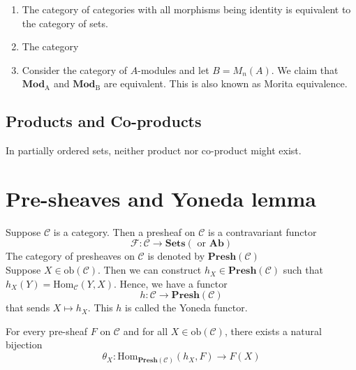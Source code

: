 \documentclass[oneside, 12pt]{scrbook}
\theoremstyle{theorem}
\begin{document}
\begin{example}
\begin{enumerate}
\item The category of categories with all morphisms being identity is equivalent to the category of sets.
\item The category 
\item Consider the category of $A$-modules and let $B = M_{n}(A)$. We claim that $\mathrm{\textbf{Mod}_{A}}$ and $\mathrm{\textbf{Mod}_{B}}$ are equivalent. This is also known as Morita equivalence.
\end{enumerate}
\end{example}

\subsection{Products and Co-products}


In partially ordered sets, neither product nor co-product might exist. \\

\section{Pre-sheaves and Yoneda lemma}

Suppose $\mathcal{C}$ is a category. Then a presheaf on $\mathcal{C}$ is a contravariant functor $$\mathcal{F} : \mathcal{C} \rightarrow \mathbf{Sets} ( \text{ or }\mathbf{Ab})$$
The category of presheaves on $\mathcal{C}$ is denoted by $\mathbf{Presh(\mathcal{C})}$\\

Suppose $X \in \mathrm{ob}(\mathcal{C})$. Then we can construct $h_{X} \in \mathbf{Presh}(\mathcal{C})$ such that $h_{X}(Y) = \mathrm{Hom}_{\mathcal{C}}(Y,X)$. Hence, we have a functor $$h : \mathcal{C} \rightarrow \mathbf{Presh}(\mathcal{C})$$ that sends $X \mapsto h_{X}$. This $h$ is called the Yoneda functor. 

\begin{lemma}
For every pre-sheaf $F$ on $\mathcal{C}$ and for all $X \in \mathrm{ob}(\mathcal{C})$, there exists a natural bijection $$\theta_{X}: \mathrm{Hom}_{\mathbf{Presh}(\mathcal{C})}(h_{X}, F) \rightarrow F(X)$$
\end{lemma}
\end{document}
